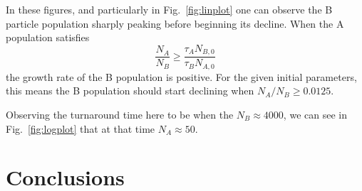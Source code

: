 \documentclass[pra,twocolumn,showpacs,amsmath,amssymb]{revtex4-1}
\begin{document}
In these figures, and particularly in Fig.~\ref{fig:linplot} one can observe the
B particle population sharply peaking before beginning its decline. When the
A population satisfies
\begin{equation}
\frac{N_A}{N_B} \geq \frac{\tau_A N_{B,0}}{\tau_B N_{A,0}}
\end{equation}
the growth rate of the B population is positive. For the given initial parameters,
this means the B population should start declining when $N_A/N_B \geq 0.0125$.

Observing the turnaround time here to be when the $N_B \approx 4000$,
we can see in Fig.~\ref{fig:logplot} that at that time $N_A \approx 50$.

\section{Conclusions} \label{sec:conclusion}

\begin{thebibliography}{1}

\end{thebibliography}
\end{document}
